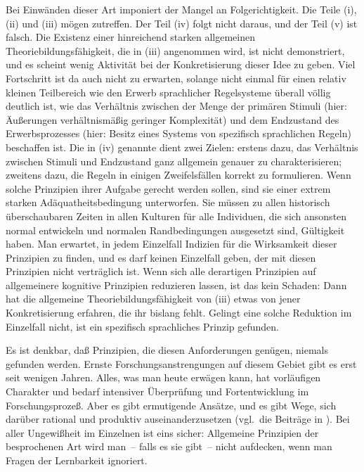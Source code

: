 \documentclass[output=paper]{langsci/langscibook}
\begin{document}
Bei Einwänden dieser Art imponiert der Mangel an Folgerichtigkeit. Die
Teile (i), (ii) und (iii) mögen zutreffen. Der Teil (iv) folgt nicht
daraus, und der Teil (v) ist falsch. Die Existenz einer hinreichend
starken allgemeinen Theoriebildungsfähigkeit, die in (iii) angenommen
wird, ist nicht demonstriert, und es scheint wenig Aktivität bei der
Konkretisierung dieser Idee zu geben. Viel Fortschritt ist da auch
nicht zu erwarten, solange nicht einmal für einen relativ kleinen
Teilbereich wie den Erwerb sprachlicher Regelsysteme überall völlig
deutlich ist, wie das Verhältnis zwischen der Menge der primären
Stimuli (hier: Äußerungen verhältnismäßig geringer Komplexität) und
dem Endzustand des Erwerbsprozesses (hier: Besitz eines Systems von
spezifisch sprachlichen Regeln) beschaffen ist. Die in (iv) genannte
 dient zwei Zielen: erstens dazu, das Verhältnis
zwischen Stimuli und Endzustand ganz allgemein genauer zu
charakterisieren; zweitens dazu, die Regeln in einigen Zweifelsfällen
korrekt zu formulieren. Wenn solche Prinzipien ihrer Aufgabe gerecht
werden sollen, sind sie einer extrem starken Adäquatheitsbedingung
unterworfen. Sie müssen zu allen historisch überschaubaren Zeiten in
allen Kulturen für alle Individuen, die sich ansonsten normal
entwickeln und normalen Randbedingungen ausgesetzt sind, Gültigkeit
haben. Man erwartet, in jedem Einzelfall Indizien für die Wirksamkeit
dieser Prinzipien zu finden, und es darf keinen Einzelfall geben, der
mit diesen Prinzipien nicht verträglich ist. Wenn sich alle derartigen
Prinzipien auf allgemeinere kognitive Prinzipien reduzieren lassen,
ist das kein Schaden: Dann hat die allgemeine Theoriebildungsfähigkeit
von (iii) etwas von jener Konkretisierung erfahren, die ihr bislang
fehlt. Gelingt eine solche Reduktion im Einzelfall nicht, ist ein
spezifisch sprachliches Prinzip gefunden.

Es ist denkbar, daß Prinzipien, die diesen Anforderungen genügen,
niemals gefunden werden. Ernste Forschungsanstrengungen auf diesem
Gebiet gibt es erst seit wenigen Jahren. Alles, was man heute erwägen
kann, hat vorläufigen Charakter und bedarf intensiver Überprüfung und
Fortentwicklung im For\-schungs\-pro\-zeß. Aber es gibt ermutigende
Ansätze, und es gibt Wege, sich darüber rational und produktiv
auseinanderzusetzen (vgl.\ \zb die Beiträge in
\citet{LogicalProblem}). Bei aller
Ungewißheit im Einzelnen ist eins sicher: Allgemeine Prinzipien der
besprochenen Art wird man~-- falls es sie gibt~-- nicht aufdecken,
wenn man Fragen der Lernbarkeit ignoriert.
\end{document}
